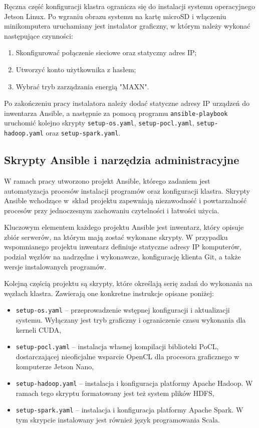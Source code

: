 Ręczna część konfiguracji klastra ogranicza się do instalacji systemu operacyjnego
Jetson Linux. Po wgraniu obrazu systemu na kartę microSD i włączeniu minikomputera
uruchamiany jest instalator graficzny, w którym należy wykonać następujące czynności:
\begin{enumerate}
	\item Skonfigurować połączenie sieciowe oraz statyczny adres IP;
	\item Utworzyć konto użytkownika z hasłem;
	\item Wybrać tryb zarządzania energią "MAXN".
\end{enumerate}

Po zakończeniu pracy instalatora należy dodać statyczne adresy IP urządzeń do inwentarza
Ansible, a następnie za pomocą programu \lstinline{ansible-playbook} uruchomić kolejno
skrypty \lstinline{setup-os.yaml}, \lstinline{setup-pocl.yaml},
\lstinline{setup-hadoop.yaml} oraz \lstinline{setup-spark.yaml}.

\subsection*{Skrypty Ansible i narzędzia administracyjne}

W ramach pracy utworzono projekt Ansible, którego zadaniem jest automatyzacja procesów instalacji
programów oraz konfiguracji klastra. Skrypty Ansible wchodzące w~skład projektu zapewniają
niezawodność i powtarzalność procesów przy jednoczesnym zachowaniu czytelności
i łatwości użycia.

Kluczowym elementem każdego projektu Ansible jest inwentarz, który opisuje zbiór serwerów, na
którym mają zostać wykonane skrypty. W przypadku wspomnianego projektu inwentarz definiuje
statyczne adresy IP komputerów, podział węzłów na nadrzędne i wykonawcze, konfigurację
klienta Git, a także wersje instalowanych programów.

Kolejną częścią projektu są skrypty, które określają serię zadań do wykonania na węzłach
klastra. Zawierają one konkretne instrukcje opisane poniżej:
\begin{itemize}
	\item \lstinline{setup-os.yaml} -- przeprowadzenie wstępnej konfiguracji i aktualizacji systemu. \newline
	      Wyłączany jest tryb graficzny i ograniczenie czasu wykonania dla kerneli CUDA,
	\item \lstinline{setup-pocl.yaml} -- instalacja własnej kompilacji biblioteki PoCL,
	      dostarczającej nieoficjalne wsparcie OpenCL dla procesora graficznego w komputerze Jetson Nano,
	\item \lstinline{setup-hadoop.yaml} -- instalacja i konfiguracja platformy Apache Hadoop. \newline
	      W ramach tego skryptu formatowany jest też system plików HDFS,
	\item \lstinline{setup-spark.yaml} -- instalacja i konfiguracja platformy Apache Spark. \newline
	      W tym skrypcie instalowany jest również język programowania Scala.
\end{itemize}

